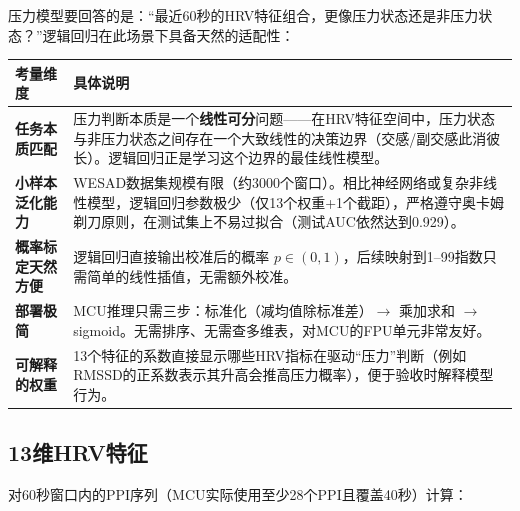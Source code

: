 \documentclass[UTF8]{ctexart}
\begin{document}
压力模型要回答的是：“最近60秒的HRV特征组合，更像压力状态还是非压力状态？”逻辑回归在此场景下具备天然的适配性：

\begin{table}[ht]
\centering
\begin{tabular}{@{}p{3.2cm}p{10cm}@{}}
\toprule
\textbf{考量维度} & \textbf{具体说明} \\
\midrule
\textbf{任务本质匹配} & 压力判断本质是一个\textbf{线性可分}问题——在HRV特征空间中，压力状态与非压力状态之间存在一个大致线性的决策边界（交感/副交感此消彼长）。逻辑回归正是学习这个边界的最佳线性模型。 \\
\textbf{小样本泛化能力} & WESAD数据集规模有限（约3000个窗口）。相比神经网络或复杂非线性模型，逻辑回归参数极少（仅13个权重+1个截距），严格遵守奥卡姆剃刀原则，在测试集上不易过拟合（测试AUC依然达到0.929）。 \\
\textbf{概率标定天然方便} & 逻辑回归直接输出校准后的概率 $p \in (0,1)$，后续映射到1--99指数只需简单的线性插值，无需额外校准。 \\
\textbf{部署极简} & MCU推理只需三步：标准化（减均值除标准差）$\rightarrow$ 乘加求和 $\rightarrow$ sigmoid。无需排序、无需查多维表，对MCU的FPU单元非常友好。 \\
\textbf{可解释的权重} & 13个特征的系数直接显示哪些HRV指标在驱动“压力”判断（例如RMSSD的正系数表示其升高会推高压力概率），便于验收时解释模型行为。 \\
\bottomrule
\end{tabular}
\end{table}

\subsection{13维HRV特征}
对60秒窗口内的PPI序列（MCU实际使用至少28个PPI且覆盖40秒）计算：
\end{document}
